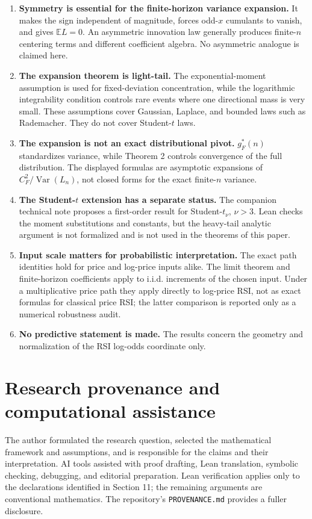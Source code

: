 \documentclass[11pt]{article}
\newcommand{\E}{\mathbb E}
\newcommand{\Var}{\operatorname{Var}}
\begin{document}
\begin{enumerate}
\item \textbf{Symmetry is essential for the finite-horizon variance expansion.} It makes the sign independent of magnitude, forces odd-$x$ cumulants to vanish, and gives $\E L=0$. An asymmetric innovation law generally produces finite-$n$ centering terms and different coefficient algebra. No asymmetric analogue is claimed here.

\item \textbf{The expansion theorem is light-tail.} The exponential-moment assumption is used for fixed-deviation concentration, while the logarithmic integrability condition controls rare events where one directional mass is very small. These assumptions cover Gaussian, Laplace, and bounded laws such as Rademacher. They do not cover Student-$t$ laws.

\item \textbf{The expansion is not an exact distributional pivot.}
$g_F^*(n)$ standardizes variance, while Theorem 2 controls convergence of the
full distribution.  The displayed formulas are asymptotic expansions of
$C_F^2/\Var(L_n)$, not closed forms for the exact finite-$n$ variance.

\item \textbf{The Student-$t$ extension has a separate status.}  The companion
technical note proposes a first-order result for Student-$t_\nu$, $\nu>3$.  Lean
checks the moment substitutions and constants, but the heavy-tail analytic
argument is not formalized and is not used in the theorems of this paper.

\item \textbf{Input scale matters for probabilistic interpretation.}  The exact
path identities hold for price and log-price inputs alike.  The limit theorem
and finite-horizon coefficients apply to i.i.d. increments of the chosen
input.  Under a multiplicative price path they apply directly to log-price RSI,
not as exact formulas for classical price RSI; the latter comparison is
reported only as a numerical robustness audit.

\item \textbf{No predictive statement is made.} The results concern the geometry and normalization of the RSI log-odds coordinate only.
\end{enumerate}

\section{Research provenance and computational assistance}
The author formulated the research question, selected the mathematical
framework and assumptions, and is responsible for the claims and their
interpretation.  AI tools assisted with proof drafting, Lean translation,
symbolic checking, debugging, and editorial preparation.  Lean verification
applies only to the declarations identified in Section 11; the remaining
arguments are conventional mathematics.  The repository's
\texttt{PROVENANCE.md} provides a fuller disclosure.
\end{document}
